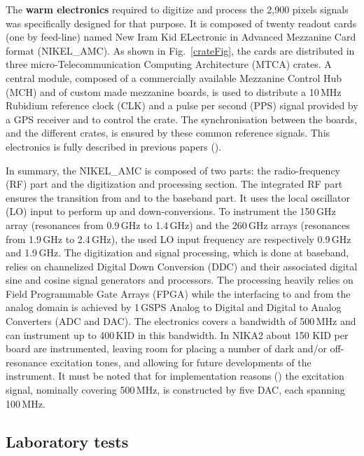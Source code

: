 \documentclass[]{aa} %
\begin{document}
The \textbf{warm electronics} required to digitize and process the 2,900 pixels signals was specifically designed for that purpose.
It is composed of twenty readout cards (one by feed-line) named New Iram Kid ELectronic in Advanced Mezzanine Card format (NIKEL\_AMC).
As shown in Fig.~\ref{crateFig}, the cards are distributed in three micro-Telecommunication Computing Architecture (MTCA) crates.
A central module, composed of a commercially available Mezzanine Control Hub (MCH) and of custom made mezzanine boards, is used to distribute a 10\,MHz Rubidium reference clock (CLK) and a pulse per second (PPS) signal provided by a GPS receiver and to control the crate. The synchronisation between the boards, and the different crates, is ensured by these common reference signals. This electronics is fully described in previous papers (\cite{Bourrion2012,Bourrion2016}).

In summary, the NIKEL\_AMC is composed of two parts: the radio-frequency (RF) part and the digitization and processing section.
The integrated RF part ensures the transition from and to the baseband part.
It uses the local oscillator (LO) input to perform up and down-conversions.
To instrument the 150\,GHz array (resonances from 0.9\,GHz to 1.4\,GHz) and the 260\,GHz arrays (resonances from 1.9\,GHz to 2.4\,GHz), the used LO input frequency are respectively 0.9\,GHz and 1.9\,GHz. The digitization and signal processing, which is done at baseband, relies on channelized Digital Down Conversion (DDC) and their associated digital sine and cosine signal generators and processors.
The processing heavily relies on Field Programmable Gate Arrays (FPGA) while the interfacing to and from the analog domain is achieved by 1\,GSPS Analog to Digital and Digital to Analog Converters (ADC and DAC).
The electronics covers a bandwidth of 500\,MHz and can instrument up to 400\,KID in this bandwidth. In NIKA2 about 150 KID per board are instrumented, leaving room for placing a number of dark and/or off-resonance excitation tones, and allowing for future developments of the instrument. 
It must be noted that for implementation reasons (\cite{Bourrion2012,Bourrion2016}) the excitation signal, nominally covering 500\,MHz, is constructed by five DAC, each spanning 100\,MHz.



\subsection{Laboratory tests}
\label{Laboratory tests}
\end{document}
